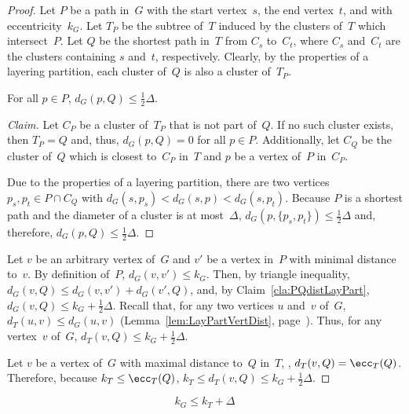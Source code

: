 \begin{proof}
Let $P$ be a path in~$G$ with the start vertex~$s$, the end vertex~$t$, and with eccentricity~$k_G$.
Let $T_P$ be the subtree of~$T$ induced by the clusters of~$T$ which intersect~$P$.
Let $Q$ be the shortest path in~$T$ from $C_s$ to~$C_t$, where $C_s$ and~$C_t$ are the clusters containing $s$ and~$t$, respectively.
Clearly, by the properties of a layering partition, each cluster of~$Q$ is also a cluster of~$T_P$.

\begin{claim}
    \label{cla:PQdistLayPart}
For all \( p \in P \), \( d_G(p, Q) \leq \frac{1}{2} \Delta \).
\end{claim}

\begin{proof}[Claim]
Let $C_P$ be a cluster of~$T_P$ that is not part of~$Q$.
If no such cluster exists, then $T_P = Q$ and, thus, $d_G(p, Q) = 0$ for all \( p \in P \).
Additionally, let $C_Q$ be the cluster of~$Q$ which is closest to~$C_P$ in~$T$ and $p$ be a vertex of~$P$ in~$C_P$.

Due to the properties of a layering partition, there are two vertices~$p_s, p_t \in P \cap C_Q$ with $d_G(s, p_s) < d_G(s, p) < d_G(s, p_t)$.
Because $P$ is a shortest path and the diameter of a cluster is at most~$\Delta$, $d_G(p, \{ p_s, p_t \} ) \leq \frac{1}{2} \Delta$ and, therefore, $d_G(p, Q) \leq \frac{1}{2} \Delta$.
\end{proof}

Let $v$ be an arbitrary vertex of~$G$ and $v'$ be a vertex in~$P$ with minimal distance to~$v$.
By definition of~$P$, $d_G(v, v') \leq k_G$.
Then, by triangle inequality, $d_G(v, Q) \leq d_G(v, v') + d_G(v', Q)$, and, by Claim~\ref{cla:PQdistLayPart}, $d_G(v, Q) \leq k_G + \frac{1}{2} \Delta$.
Recall that, for any two vertices $u$ and~$v$ of~$G$, $d_T(u, v) \leq d_G(u, v)$ (Lemma~\ref{lem:LayPartVertDist}, page~\pageref{lem:LayPartVertDist}).
Thus, for any vertex~$v$ of~$G$, $d_T(v, Q) \leq k_G + \frac{1}{2} \Delta$.

Let $v$ be a vertex of~$G$ with maximal distance to~$Q$ in~$T$, \ie, $d_T(v, Q) = \ecc_T(Q)$.
Therefore, because $k_T \leq \ecc_T(Q)$, $k_T \leq d_T(v, Q) \leq k_G + \frac{1}{2} \Delta$.
\end{proof}

\begin{lemma}
    \label{lem:mespLayPartUpBound}
\[
    k_G \leq k_T + \Delta
\]
\end{lemma}

